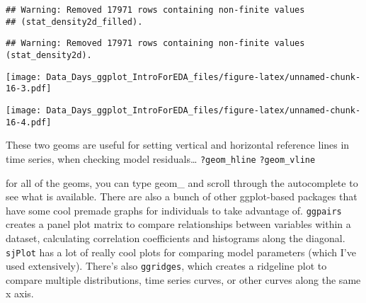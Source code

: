 \documentclass[
]{article}
\newenvironment{Shaded}{\begin{snugshade}}{\end{snugshade}}
\newcommand{\CommentTok}[1]{\textcolor[rgb]{0.56,0.35,0.01}{\textit{#1}}}
\newcommand{\DataTypeTok}[1]{\textcolor[rgb]{0.13,0.29,0.53}{#1}}
\newcommand{\DecValTok}[1]{\textcolor[rgb]{0.00,0.00,0.81}{#1}}
\newcommand{\KeywordTok}[1]{\textcolor[rgb]{0.13,0.29,0.53}{\textbf{#1}}}
\newcommand{\NormalTok}[1]{#1}
\newcommand{\OperatorTok}[1]{\textcolor[rgb]{0.81,0.36,0.00}{\textbf{#1}}}
\newcommand{\StringTok}[1]{\textcolor[rgb]{0.31,0.60,0.02}{#1}}
\begin{document}
\begin{Shaded}
\end{Shaded}

\begin{verbatim}
## Warning: Removed 17971 rows containing non-finite values
## (stat_density2d_filled).
\end{verbatim}

\begin{verbatim}
## Warning: Removed 17971 rows containing non-finite values (stat_density2d).
\end{verbatim}

\texttt{[image: Data\_Days\_ggplot\_IntroForEDA\_files/figure-latex/unnamed-chunk-16-3.pdf]}

\begin{Shaded}
\end{Shaded}

\texttt{[image: Data\_Days\_ggplot\_IntroForEDA\_files/figure-latex/unnamed-chunk-16-4.pdf]}

These two geoms are useful for setting vertical and horizontal reference
lines in time series, when checking model residuals\ldots{}
\texttt{?geom\_hline} \texttt{?geom\_vline}

for all of the geoms, you can type geom\_ and scroll through the
autocomplete to see what is available. There are also a bunch of other
ggplot-based packages that have some cool premade graphs for individuals
to take advantage of. \texttt{ggpairs} creates a panel plot matrix to
compare relationships between variables within a dataset, calculating
correlation coefficients and histograms along the diagonal.
\texttt{sjPlot} has a lot of really cool plots for comparing model
parameters (which I've used extensively). There's also
\texttt{ggridges}, which creates a ridgeline plot to compare multiple
distributions, time series curves, or other curves along the same x
axis.
\end{document}
